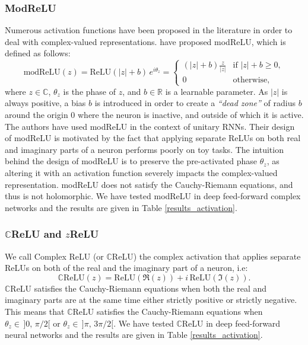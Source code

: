 \documentclass{article}
\begin{document}
\subsubsection{ModReLU}
Numerous activation functions have been proposed in the literature in order to deal with complex-valued representations. \citep{arjovsky2015unitary} have proposed modReLU, which is defined as follows:
\begin{equation}\label{modrelu}
\textrm{modReLU}(z) = \textrm{ReLU}(|z| + b) \, e^{i\theta_{z}}= \begin{cases}
(|z| + b)\frac{z}{|z|} & \textrm{if } |z| + b \geq{0}, \\
0 & \textrm{otherwise,}
\end{cases}
\end{equation}
where $z \in \mathbb{C}$, $\theta_{z}$ is the phase of $z$, and $b \in \mathbb{R}$ is a learnable parameter. As $|z|$ is always positive, a bias $b$ is introduced in order to create a \textit{``dead zone''} of radius $b$ around the origin $0$ where the neuron is inactive, and outside of which it is active. The authors have used modReLU in the context of unitary RNNs. Their design of modReLU is motivated by the fact that applying separate ReLUs on both real and imaginary parts of a neuron performs poorly on toy tasks. The intuition behind the design of modReLU is to preserve the pre-activated phase $\theta_{z}$, as altering it with an activation function severely impacts the complex-valued representation. modReLU does not satisfy the Cauchy-Riemann equations, and thus is not holomorphic. We have tested modReLU in deep feed-forward complex networks and the results are given in Table \ref{results_activation}.

\subsubsection{$\mathbb{C}$ReLU and $z$ReLU}
We call Complex ReLU (or $\mathbb{C}$ReLU) the complex activation that applies separate ReLUs on both of the real and the imaginary part of a neuron, i.e:
\begin{equation}\label{crelu}
\mathbb{C}\textrm{ReLU}(z) = \textrm{ReLU}(\Re(z)) + i \, \textrm{ReLU}(\Im(z)).
\end{equation}
$\mathbb{C}$ReLU satisfies the Cauchy-Riemann equations when both the real and imaginary parts are at the same time either strictly positive or strictly negative. This means that $\mathbb{C}$ReLU satisfies the Cauchy-Riemann equations when $\theta_{z} \in \, ]0, \,  \pi / 2[$ or $\theta_{z} \in \, ]\pi, \,  3 \pi / 2[$. We have tested $\mathbb{C}$ReLU in deep feed-forward neural networks and the results are given in Table \ref{results_activation}.
\end{document}
